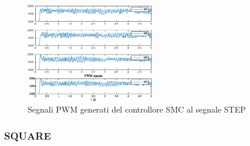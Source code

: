 \begin{figure}
	\centering
	\includegraphics[width=0.5\textwidth]{Simulazioni/Figure/SMC/STEP/PWM}
	\caption{Segnali PWM generati del controllore SMC al segnale STEP}
\end{figure}
\clearpage

\subsubsection{SQUARE}
